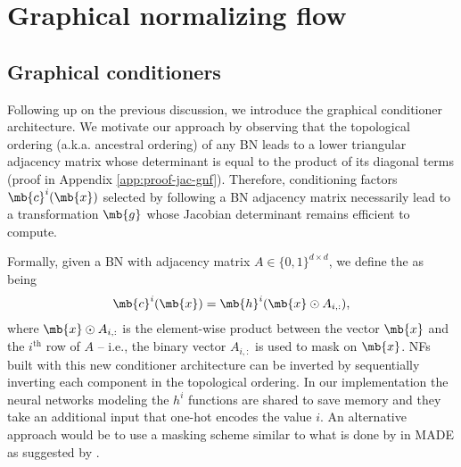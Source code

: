 \section{Graphical normalizing flow}
\subsection{Graphical conditioners}
Following up on the previous discussion, we introduce the graphical conditioner architecture.
We motivate our approach by observing that the topological ordering (a.k.a. ancestral ordering) of any BN leads to a lower triangular adjacency matrix whose determinant is equal to the product of its diagonal terms (proof in Appendix \ref{app:proof-jac-gnf}).
Therefore, conditioning factors $\mb{c}^i(\mb{x})$ selected by following a BN adjacency matrix necessarily lead to a transformation $\mb{g}$ whose Jacobian determinant remains efficient to compute.

Formally, given a BN with adjacency matrix $A \in \{0, 1\}^{d\times d}$, we define the  as being
\begin{align}
    \mb{c}^i(\mb{x}) = \mb{h}^i(\mb{x} \odot A_{i,:}),
\label{eq:gnf}
\end{align}
where $\mb{x} \odot A_{i,:}$ is the element-wise product between the vector $\mb{x}$ and the $i^{\text{th}}$ row of $A$ -- i.e., the binary vector $A_{i, :}$ is used to mask on $\mb{x}$.
NFs built with this new conditioner architecture can be inverted by sequentially inverting each component in the topological ordering.
In our implementation the neural networks modeling the $h^i$ functions are shared to save memory and they take an additional input that one-hot encodes the value $i$. An alternative approach would be to use a masking scheme similar to what is done by \citet{MADE} in MADE as suggested by \cite{DAG-3}.


